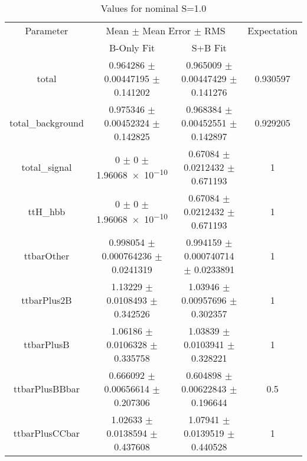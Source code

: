 \begin{table}
\centering
\caption{Values for nominal S=1.0}
\begin{tabular}{cccc}
\toprule
Parameter & \multicolumn{2}{c}{Mean $\pm$ Mean Error $\pm$ RMS} & Expectation\\
 & B-Only Fit & S+B Fit & \\
\midrule
total & \num{0.964286} $\pm$ \num{0.00447195} $\pm$ \num{0.141202} & \num{0.965009} $\pm$ \num{0.00447429} $\pm$ \num{0.141276} & \num{0.930597}\\
total\_background & \num{0.975346} $\pm$ \num{0.00452324} $\pm$ \num{0.142825} & \num{0.968384} $\pm$ \num{0.00452551} $\pm$ \num{0.142897} & \num{0.929205}\\
total\_signal & \num{0} $\pm$ \num{0} $\pm$ \num{1.96068e-10} & \num{0.67084} $\pm$ \num{0.0212432} $\pm$ \num{0.671193} & \num{1}\\
ttH\_hbb & \num{0} $\pm$ \num{0} $\pm$ \num{1.96068e-10} & \num{0.67084} $\pm$ \num{0.0212432} $\pm$ \num{0.671193} & \num{1}\\
ttbarOther & \num{0.998054} $\pm$ \num{0.000764236} $\pm$ \num{0.0241319} & \num{0.994159} $\pm$ \num{0.000740714} $\pm$ \num{0.0233891} & \num{1}\\
ttbarPlus2B & \num{1.13229} $\pm$ \num{0.0108493} $\pm$ \num{0.342526} & \num{1.03946} $\pm$ \num{0.00957696} $\pm$ \num{0.302357} & \num{1}\\
ttbarPlusB & \num{1.06186} $\pm$ \num{0.0106328} $\pm$ \num{0.335758} & \num{1.03839} $\pm$ \num{0.0103941} $\pm$ \num{0.328221} & \num{1}\\
ttbarPlusBBbar & \num{0.666092} $\pm$ \num{0.00656614} $\pm$ \num{0.207306} & \num{0.604898} $\pm$ \num{0.00622843} $\pm$ \num{0.196644} & \num{0.5}\\
ttbarPlusCCbar & \num{1.02633} $\pm$ \num{0.0138594} $\pm$ \num{0.437608} & \num{1.07941} $\pm$ \num{0.0139519} $\pm$ \num{0.440528} & \num{1}\\
\bottomrule
\end{tabular}
\end{table}